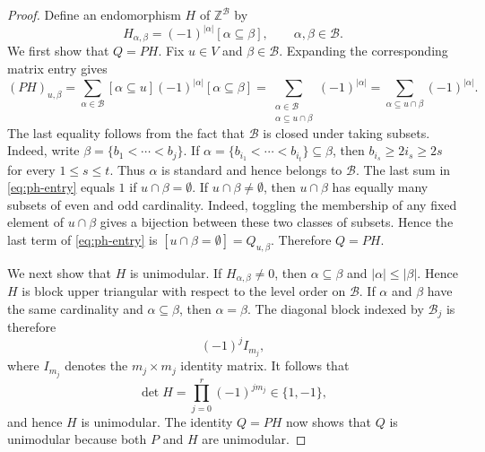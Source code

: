 \documentclass[10pt,a4paper]{amsart}
\begin{document}
\begin{proof}
Define an endomorphism $H$ of $\mathbb Z^{\mathcal B}$ by
\[
  H_{\alpha,\beta}
  =(-1)^{|\alpha|}[\alpha\subseteq\beta],
  \qquad \alpha,\beta\in\mathcal B.
\]
We first show that $Q=PH$.
Fix $u\in V$ and $\beta\in\mathcal B$. Expanding the corresponding matrix
entry gives
\begin{equation}\label{eq:ph-entry}
  (PH)_{u,\beta}
  =
  \sum_{\alpha\in\mathcal B}
  [\alpha\subseteq u](-1)^{|\alpha|}[\alpha\subseteq\beta]
  =
  \sum_{\substack{\alpha\in\mathcal B\\
                   \alpha\subseteq u\cap\beta}}
  (-1)^{|\alpha|}
  =
  \sum_{\alpha\subseteq u\cap\beta}
  (-1)^{|\alpha|}.
\end{equation}
The last equality follows from the fact that $\mathcal B$ is closed under
taking subsets. Indeed, write $\beta=\{b_1<\cdots<b_j\}$. If
$\alpha=\{b_{i_1}<\cdots<b_{i_t}\}\subseteq\beta$, then
$b_{i_s}\ge2i_s\ge2s$ for every $1\le s\le t$. Thus $\alpha$ is
standard and hence belongs to $\mathcal B$. The last sum in
\eqref{eq:ph-entry} equals $1$ if $u\cap\beta=\emptyset$. If
$u\cap\beta\ne\emptyset$, then $u\cap\beta$ has equally many subsets of even
and odd cardinality. Indeed, toggling the membership of any fixed element of
$u\cap\beta$ gives a bijection between these two classes of subsets. Hence
the last term of \eqref{eq:ph-entry} is $
  [u\cap\beta=\emptyset]
  =Q_{u,\beta}.
$
Therefore $Q=PH$.

We next show that $H$ is unimodular. If
$H_{\alpha,\beta}\ne0$, then $\alpha\subseteq\beta$ and
$|\alpha|\le|\beta|$. Hence $H$ is block upper triangular with respect to the
level order on $\mathcal B$. If $\alpha$ and $\beta$ have the same
cardinality and $\alpha\subseteq\beta$, then $\alpha=\beta$. The diagonal
block indexed by $\mathcal B_j$ is therefore
\[
  (-1)^jI_{m_j},
\]
where $I_{m_j}$ denotes the $m_j\times m_j$ identity matrix.
It follows that
\[
  \det H=\prod_{j=0}^r(-1)^{j m_j}\in\{1,-1\},
\]
and hence $H$ is unimodular. The identity
$Q=PH$ now shows that $Q$ is unimodular
because both $P$ and $H$ are unimodular.
\end{proof}
\end{document}
